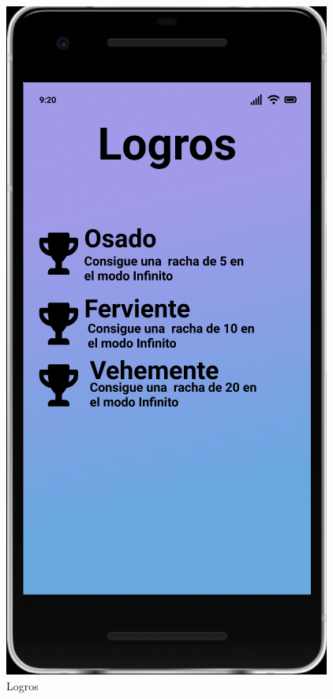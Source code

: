 \documentclass{article}
\begin{document}
\begin{figure}[H]
    \centering
    \includegraphics[scale=0.9]{imgs/Figma/Logros}
    \caption{Logros}
\end{figure}

\pagebreak
\end{document}
